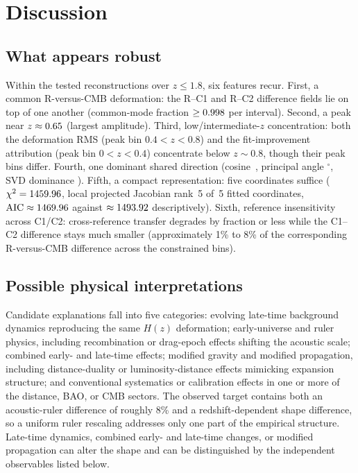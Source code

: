 \section{Discussion}
\label{sec:discussion}

\subsection{What appears robust}
\label{sec:robust}

Within the tested reconstructions over $z\le1.8$, six features recur. First, a
common R-versus-CMB deformation: the R–C1 and R–C2 difference fields lie on
top of one another (common-mode fraction
$\ge0.998{}$ per interval). Second, a peak near
$z\approx0.65{}$ (largest amplitude). Third, low/intermediate-$z$
concentration: both the deformation RMS (peak bin $0.4<z<0.8$)
and the
fit-improvement attribution (peak bin $0<z<0.4$) concentrate below
$z\sim0.8$, though their peak bins differ. Fourth, one
dominant shared direction (cosine~\GeometryCosineSimilarity{},
principal angle \GeometryPrincipalAngle$^{\circ}$, SVD dominance
\GeometrySvdDominance{}). Fifth, a compact representation: five
coordinates suffice
($\chi^{2}=1459.96{}$, local projected Jacobian rank~5 of~5
fitted coordinates,
$\mathrm{AIC}\approx1469.96{}$ against
$\approx1493.92{}$ descriptively). Sixth, reference
insensitivity across C1/C2:
cross-reference transfer degrades by fraction
\GeometryTransferDegradation{} or less while the C1–C2 difference
stays much smaller (approximately 1\% to 8\% of the corresponding R-versus-CMB difference across the
constrained bins).

\subsection{Possible physical interpretations}
\label{sec:interpretations}

Candidate explanations fall into five categories: evolving
late-time background dynamics reproducing the same $H(z)$
deformation; early-universe and ruler physics, including
recombination or drag-epoch effects shifting the acoustic scale;
combined early- and late-time effects; modified
gravity and modified propagation, including distance-duality or
luminosity-distance effects mimicking expansion structure; and
conventional systematics or calibration effects in one or more of
the distance, BAO, or CMB sectors.
The observed target contains both an acoustic-ruler difference of roughly 8\% and a redshift-dependent shape difference, so a uniform ruler rescaling addresses only one part of the empirical structure. Late-time dynamics, combined early- and late-time changes, or modified propagation can alter the shape and can be distinguished by the independent observables listed below.

